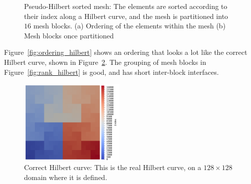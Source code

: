 \begin{figure}[H]
	\centering
	\caption{Pseudo-Hilbert sorted mesh: The elements are sorted according to their index along a Hilbert curve, and the mesh is partitioned into \(16\) mesh blocks. (a) Ordering of the elements within the mesh (b) Mesh blocks once partitioned}\label{fig:mesh_hilbert}
\end{figure}

Figure~\ref{fig:ordering_hilbert} shows an ordering that looks a lot like the correct Hilbert curve,
shown in Figure~\ref{fig:correct_hilbert_numbering}. The grouping of mesh blocks in
Figure~\ref{fig:rank_hilbert} is good, and has short inter-block interfaces.


\begin{figure}[H]
	\centering
	\includegraphics[width=0.45\textwidth]{Chapter_renumbering/media/correct_hilbert_ordering}
	\caption{Correct Hilbert curve: This is the real Hilbert curve, on a \(128 \times 128\) domain where it is defined.}\label{fig:correct_hilbert_numbering}
\end{figure}

